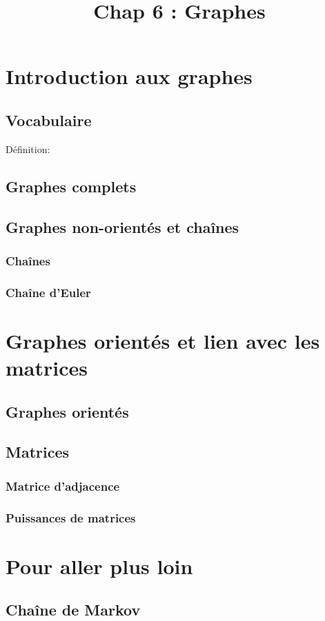 \documentclass{article}
\title{\vspace{-2em}\Huge{\textbf{Chap 6 : Graphes}}\vspace{-1.5em}}
\author{}
\date{}
\begin{document}
    \maketitle

    \section{Introduction aux graphes}
        \subsection{Vocabulaire}
            Définition:\\
        
        \subsection{Graphes complets}
        \subsection{Graphes non-orientés et chaînes}
            \subsubsection{Chaînes}
            \subsubsection{Chaîne d'Euler}


    \section{Graphes orientés et lien avec les matrices}
        \subsection{Graphes orientés}
        \subsection{Matrices}
            \subsubsection{Matrice d'adjacence}
            \subsubsection{Puissances de matrices}


    \section{Pour aller plus loin}
        \subsection{Chaîne de Markov}

        \begin{tikzpicture}[node distance={15mm}, thick, main/.style = {draw, circle}]
            
        \end{tikzpicture}
\end{document}

